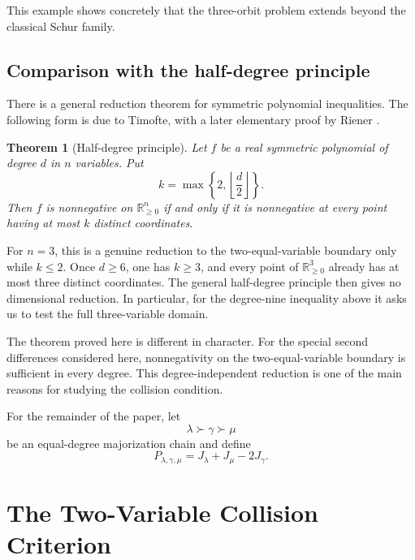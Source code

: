 \documentclass[11pt]{article}
\newtheorem{theorem}{Theorem}[section]
\theoremstyle{definition}
\begin{document}
This example shows concretely that the three-orbit problem extends beyond the classical Schur family.

\subsection{Comparison with the half-degree principle}

There is a general reduction theorem for symmetric polynomial inequalities.  The following form is due to Timofte, with a later elementary proof by Riener \cite{Timofte2003,Riener2012}.

\begin{theorem}[Half-degree principle]\label{thm:half-degree}
Let \(f\) be a real symmetric polynomial of degree \(d\) in \(n\) variables.  Put
\begin{equation*}
k=\max\left\{2,\left\lfloor\frac d2\right\rfloor\right\}.
\end{equation*}
Then \(f\) is nonnegative on \(\mathbb R_{\ge0}^n\) if and only if it is nonnegative at every point having at most \(k\) distinct coordinates.
\end{theorem}

For \(n=3\), this is a genuine reduction to the two-equal-variable boundary only while \(k\le2\).  Once \(d\ge6\), one has \(k\ge3\), and every point of \(\mathbb R_{\ge0}^3\) already has at most three distinct coordinates.  The general half-degree principle then gives no dimensional reduction.  In particular, for the degree-nine inequality above it asks us to test the full three-variable domain.

The theorem proved here is different in character.  For the special second differences considered here, nonnegativity on the two-equal-variable boundary is sufficient in every degree.  This degree-independent reduction is one of the main reasons for studying the collision condition.

For the remainder of the paper, let
\begin{equation*}
\lambda\succ\gamma\succ\mu
\end{equation*}
be an equal-degree majorization chain and define
\begin{equation*}
P_{\lambda,\gamma,\mu}
=J_\lambda+J_\mu-2J_\gamma.
\end{equation*}

\section{The Two-Variable Collision Criterion}
\end{document}
